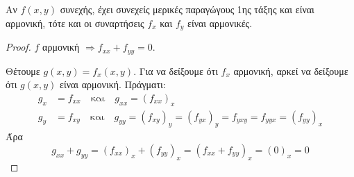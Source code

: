 \begin{prop}
\item {}
    Αν $ f(x,y) $ συνεχής, έχει συνεχείς μερικές παραγώγους 1ης τάξης 
    και είναι αρμονική, τότε και οι συναρτήσεις $ f_{x} $ και $ f_{y} $
    είναι αρμονικές. 
\end{prop}
\begin{proof}
\item {}
    $f$ αρμονική $ \Rightarrow f_{xx}+f_{yy}=0 $.

    Θέτουμε $ g(x,y)=f_{x}(x,y) $. Για να δείξουμε ότι $ f_{x} $ αρμονική, 
    αρκεί να δείξουμε ότι $ g(x,y) $ είναι αρμονική. Πράγματι:
    \begin{align*}
        g_{x} &= f_{xx} \quad \text{και} \quad g_{xx} = (f_{xx})_{x} \\ 
        g_{y} &= f_{xy} \quad \text{και} \quad g_{yy} = (f_{xy})_{y} =
        (f_{yx})_{y} = f_{yxy} = f_{yyx} = (f_{yy})_{x}
    \end{align*}
    Άρα 
    \[
        g_{xx}+g_{yy} = (f_{xx})_{x} + (f_{yy})_{x} = 
        (f_{xx}+f_{yy})_{x}= (0)_{x} =0
    \] 
\end{proof}

